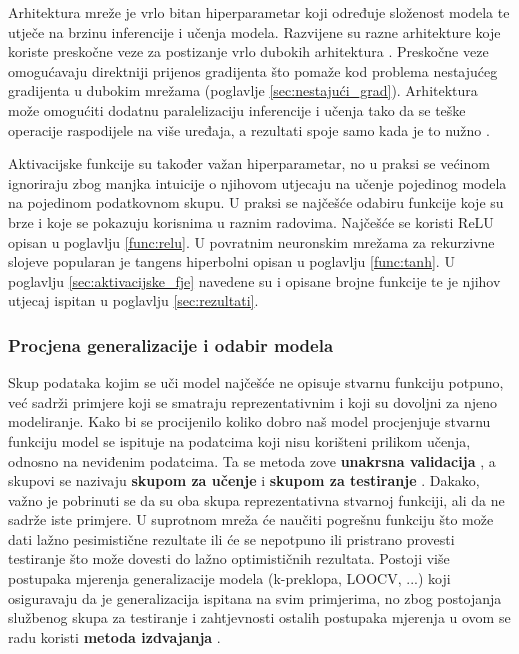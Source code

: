 \documentclass[times, utf8, numeric, diplomski]{fer}
\def\secref#1{(poglavlje \ref{#1})}
\begin{document}
Arhitektura mreže je vrlo bitan hiperparametar koji određuje složenost modela te utječe na brzinu inferencije i učenja modela. Razvijene su razne arhitekture koje koriste preskočne veze za postizanje vrlo dubokih arhitektura \citep{resnet, densenet}. Preskočne veze omogućavaju direktniji prijenos gradijenta što pomaže kod problema nestajućeg gradijenta u dubokim mrežama \secref{sec:nestajući_grad}. Arhitektura može omogućiti dodatnu paralelizaciju inferencije i učenja tako da se teške operacije raspodijele na više uređaja, a rezultati spoje samo kada je to nužno \citep{alexnet}.

Aktivacijske funkcije su također važan hiperparametar, no u praksi se većinom ignoriraju zbog manjka intuicije o njihovom utjecaju na učenje pojedinog modela na pojedinom podatkovnom skupu. U praksi se najčešće odabiru funkcije koje su brze i koje se pokazuju korisnima u raznim radovima. Najčešće se koristi ReLU opisan u poglavlju \ref{func:relu}. U povratnim neuronskim mrežama za rekurzivne slojeve popularan je tangens hiperbolni opisan u poglavlju \ref{func:tanh}. U poglavlju \ref{sec:aktivacijske_fje} navedene su i opisane brojne funkcije te je njihov utjecaj ispitan u poglavlju \ref{sec:rezultati}.

\subsubsection{Procjena generalizacije i odabir modela}
\label{sec:crossval}
Skup podataka kojim se uči model najčešće ne opisuje stvarnu funkciju potpuno, već sadrži primjere koji se smatraju reprezentativnim i koji su dovoljni za njeno modeliranje. Kako bi se procijenilo koliko dobro naš model procjenjuje stvarnu funkciju model se ispituje na podatcima koji nisu korišteni prilikom učenja, odnosno na neviđenim podatcima. Ta se metoda zove \textbf{unakrsna validacija} , a skupovi se nazivaju \textbf{skupom za učenje}  i \textbf{skupom za testiranje} . Dakako, važno je pobrinuti se da su oba skupa reprezentativna stvarnoj funkciji, ali da ne sadrže iste primjere. U suprotnom mreža će naučiti pogrešnu funkciju što može dati lažno pesimistične rezultate ili će se nepotpuno ili pristrano provesti testiranje što može dovesti do lažno optimističnih rezultata. Postoji više postupaka mjerenja generalizacije modela (k-preklopa, LOOCV, ...) koji osiguravaju da je generalizacija ispitana na svim primjerima, no zbog postojanja službenog skupa za testiranje i zahtjevnosti ostalih postupaka mjerenja u ovom se radu koristi \textbf{metoda izdvajanja} .
\end{document}
